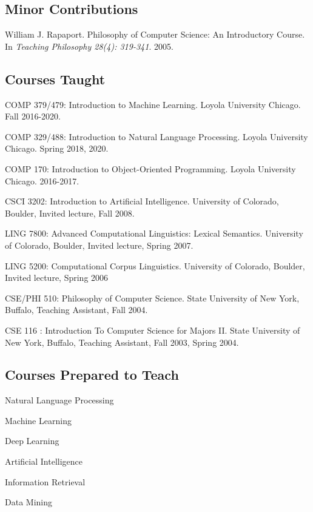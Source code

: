 \documentclass[letterpaper]{article}
\renewenvironment{itemize}{
  \begin{list}{}{
    \setlength{\leftmargin}{1.5em}
  }
}{
  \end{list}
}
\begin{document}
\subsection*{Minor Contributions}
\begin{itemize}
\item William J. Rapaport. Philosophy of Computer Science: An Introductory Course. In \emph {Teaching Philosophy 28(4): 319-341}. 2005.
\end{itemize}

\subsection*{Courses Taught}

\begin{itemize}
\item COMP 379/479: Introduction to Machine Learning. Loyola University Chicago. Fall 2016-2020.
\item COMP 329/488: Introduction to Natural Language Processing. Loyola University Chicago. Spring 2018, 2020.
\item COMP 170: Introduction to Object-Oriented Programming. Loyola University Chicago. 2016-2017.
\item CSCI 3202: Introduction to Artificial Intelligence. University of Colorado, Boulder, Invited lecture, Fall 2008.
\item LING 7800: Advanced Computational Linguistics: Lexical Semantics. University of Colorado, Boulder, Invited lecture, Spring 2007.
\item LING 5200: Computational Corpus Linguistics. University of Colorado, Boulder, Invited lecture, Spring 2006
\item CSE/PHI 510: Philosophy of Computer Science. State University of New York, Buffalo, Teaching Assistant, Fall 2004.
\item CSE 116 : Introduction To Computer Science for Majors II. State University of New York, Buffalo, Teaching Assistant, Fall 2003, Spring 2004.
\end{itemize}

\subsection*{Courses Prepared to Teach}

\begin{itemize}
\item Natural Language Processing
\item Machine Learning
\item Deep Learning
\item Artificial Intelligence
\item Information Retrieval
\item Data Mining
\end{itemize}
\end{document}

